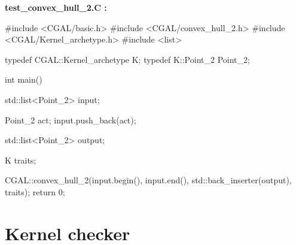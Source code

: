{\bf test\_convex\_hull\_2.C :}

\begin{ccExampleCode}
#include <CGAL/basic.h>
#include <CGAL/convex_hull_2.h>
#include <CGAL/Kernel_archetype.h>
#include <list>

typedef CGAL::Kernel_archetype      K;
typedef K::Point_2                  Point_2;

int main()
{
  std::list<Point_2> input;
  
  Point_2 act;
  input.push_back(act);

  std::list<Point_2> output;

  K  traits;

  CGAL::convex_hull_2(input.begin(), input.end(),
                      std::back_inserter(output), traits);		        
  return 0;
}
\end{ccExampleCode}

\ccHtmlLinksOn

\section{Kernel checker}
